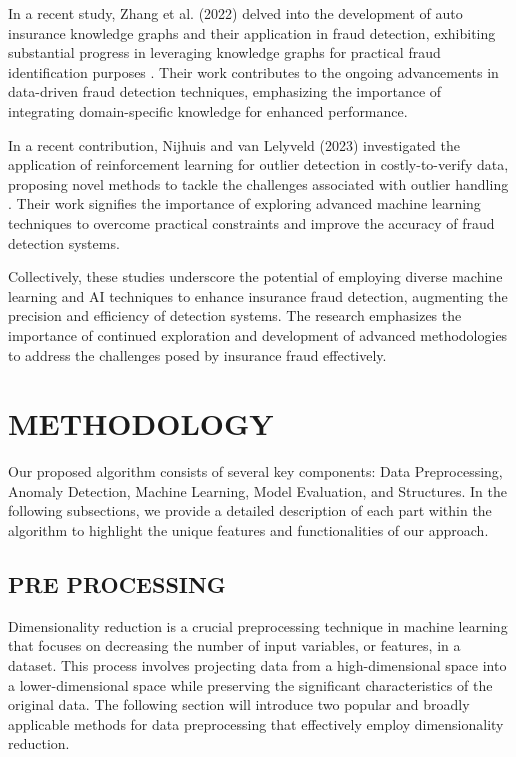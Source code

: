 \documentclass[12pt]{article}
\begin{document}
In a recent study, Zhang et al. (2022) delved into the development
of auto insurance knowledge graphs and their application in fraud
detection, exhibiting substantial progress in leveraging knowledge
graphs for practical fraud identification purposes \cite{A27}.
Their work contributes to the ongoing advancements in data-driven
fraud detection techniques, emphasizing the importance of
integrating domain-specific knowledge for enhanced performance.


In a recent contribution, Nijhuis and van Lelyveld (2023)
investigated the application of reinforcement learning for outlier
detection in costly-to-verify data, proposing novel methods to
tackle the challenges associated with outlier handling \cite{A73}.
Their work signifies the importance of exploring advanced machine
learning techniques to overcome practical constraints and improve
the accuracy of fraud detection systems.

Collectively, these studies underscore the potential of employing
diverse machine learning and AI techniques to enhance insurance
fraud detection, augmenting the precision and efficiency of
detection systems. The research emphasizes the importance of
continued exploration and development of advanced methodologies to
address the challenges posed by insurance fraud effectively.


\section{METHODOLOGY}\label{SC:METHOD}
Our proposed algorithm consists of several key components: Data
Preprocessing, Anomaly Detection, Machine Learning, Model
Evaluation, and Structures. In the following subsections, we
provide a detailed description of each part within the algorithm
to highlight the unique features and functionalities of our
approach.
    \subsection{PRE PROCESSING}\label{SSC:PreProcessing}
Dimensionality reduction is a crucial preprocessing technique in
machine learning that focuses on decreasing the number of input
variables, or features, in a dataset. This process involves
projecting data from a high-dimensional space into a
lower-dimensional space while preserving the significant
characteristics of the original data. The following section will
introduce two popular and broadly applicable methods for data
preprocessing that effectively employ dimensionality reduction.
\end{document}
